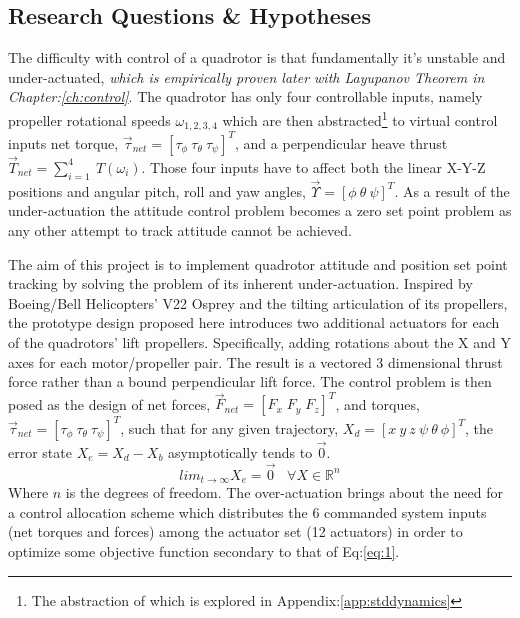 \subsection{Research Questions \& Hypotheses}
\label{subsec:intro.foreword.hypotheses}
The difficulty with control of a quadrotor is that fundamentally it's unstable and under-actuated, \emph{which is empirically proven later with Layupanov Theorem in Chapter:\ref{ch:control}}. The quadrotor has only four controllable inputs, namely propeller rotational speeds $\omega_{1,2,3,4}$ which are then abstracted\footnote{The abstraction of which is explored in Appendix:\ref{app:stddynamics}} to virtual control inputs net torque, $\vec{\tau}_{net}=[\tau_{\phi}~\tau_{\theta}~\tau_{\psi}]^T$, and a perpendicular heave thrust $\vec{T}_{net}=\sum_{i=1}^{4}~T(\omega_i)$. Those four inputs have to affect both the linear X-Y-Z positions and angular pitch, roll and yaw angles, $\vec{\Upsilon}=[\phi~\theta~\psi]^T$. As a result of the under-actuation the attitude control problem becomes a zero set point problem as any other attempt to track attitude cannot be achieved.
\par
The aim of this project is to implement quadrotor attitude and position set point tracking by solving the problem of its inherent under-actuation. Inspired by Boeing/Bell Helicopters' V22 Osprey and the tilting articulation of its propellers, the prototype design proposed here introduces two additional actuators for each of the quadrotors' lift propellers. Specifically, adding rotations about the X and Y axes for each motor/propeller pair. The result is a vectored 3 dimensional thrust force rather than a bound perpendicular lift force. The control problem is then posed as the design of net forces, $\vec{F}_{net} = [F_x\;F_y\;F_z]^T$, and torques, $\vec{\tau}_{net} = [\tau_{\phi}~\tau_{\theta}~\tau_{\psi}]^T$, such that for any given trajectory, $X_d=[x~y~z~\psi~\theta~\phi]^T$, the error state $X_e = X_d - X_b$ asymptotically tends to $\vec{0}$.
\begin{equation} \label{eq:1}
lim_{t \rightarrow \infty} X_e = \vec{0}\hspace{10pt}\forall X \in \mathbb{R}^n
\end{equation}
Where $n$ is the degrees of freedom. The over-actuation brings about the need for a control allocation scheme which distributes the 6 commanded system inputs (net torques and forces) among the actuator set (12 actuators) in order to optimize some objective function secondary to that of Eq:\ref{eq:1}.

